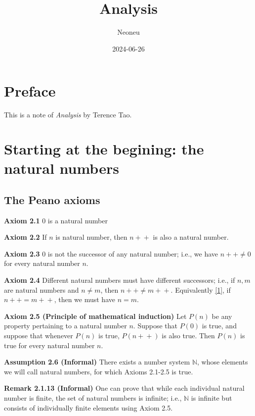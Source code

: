 \documentclass[
]{book}
\title{Analysis}
\author{Neoneu}
\date{2024-06-26}
\theoremstyle{definition}
\theoremstyle{definition}
\theoremstyle{definition}
\theoremstyle{definition}
\theoremstyle{remark}
\begin{document}
\maketitle

{
\setcounter{tocdepth}{1}
\tableofcontents
}
\chapter*{Preface}\label{preface}

This is a note of \emph{Analysis} by Terence Tao.

\chapter{Starting at the begining: the natural numbers}\label{start}

\section{The Peano axioms}\label{the-peano-axioms}

\textbf{Axiom 2.1} \(0\) is a natural number

\textbf{Axiom 2.2} If \(n\) is natural number, then \(n+\!\!+\) is also a natural number.

\textbf{Axiom 2.3} \(0\) is not the successor of any natural number; i.e., we have \(n+\!\!+\ne 0\) for every natural number \(n\).

\textbf{Axiom 2.4} Different natural numbers must have different successors; i.e., if \(n,m\) are natural numbers and \(n\ne m\), then \(n+\!\!+ \ne m+\!\!+\). Equivalently \ref{1}, if \(n+\!\!+ = m+\!\!+\), then we must have \(n = m\).

\textbf{Axiom 2.5 (Principle of mathematical induction)} Let \(P(n)\) be any property pertaining to a natural number \(n\). Suppose that \(P(0)\) is true, and suppose that whenever \(P(n)\) is true, \(P(n+\!\!+)\) is also true. Then \(P(n)\) is true for every natural number \(n\).

\textbf{Assumption 2.6 (Informal)} There exists a number system \(\mathbb{N}\), whose elements we will call natural numbers, for which Axioms 2.1-2.5 is true.

\textbf{Remark 2.1.13 (Informal)} One can prove that while each individual natural number is finite, the set of natural numbers is infinite; i.e., \(\mathbb{N}\) is infinite but consists of individually finite elements using Axiom 2.5.
\end{document}
